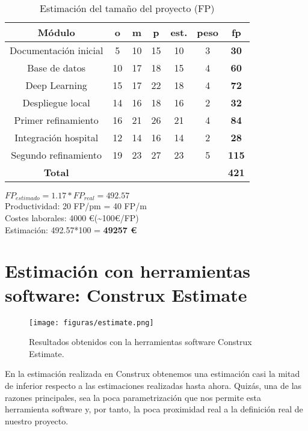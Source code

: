 \begin{table}[H]
	\begin{center}
		\begin{tabular}{|c||c|c|c|c|c|c|}
			\hline 
			Módulo & o & m & p & est. & peso & \textbf{fp} \\
			\hline \hline
			Documentación inicial & 5 & 10 & 15 & 10 & 3 & \textbf{30}  \\ \hline
			Base de datos & 10 & 17 & 18 & 15 & 4 & \textbf{60}  \\ \hline
			Deep Learning & 15 & 17 & 22 & 18 & 4 & \textbf{72}  \\ \hline
			Despliegue local & 14 & 16 & 18 & 16 & 2 & \textbf{32}  \\ \hline
			Primer refinamiento & 16 & 21 & 26 & 21 & 4 & \textbf{84}  \\ \hline
			Integración hospital & 12 & 14 & 16 & 14 & 2 & \textbf{28}  \\ \hline
			Segundo refinamiento & 19 & 23 & 27 & 23 & 5 & \textbf{115}  \\ \hline
			\textbf{Total} & & & & & & \textbf{421}  \\ \hline
		\end{tabular}
		\caption{Estimación del tamaño del proyecto (FP)}
		\label{tabla:FP}
	\end{center}
\end{table}


$FP_{estimado} = 1.17 * FP_{real} = 492.57$ \\
Productividad: 20 FP/pm = 40 FP/m \\
Costes laborales: 4000 \euro (\textasciitilde{}100\euro/FP) \\
Estimación: 492.57*100 = \textbf{49257 \euro} 

\section{Estimación con herramientas software: Construx Estimate}

\begin{figure}[H]
	\centering
	\texttt{[image: figuras/estimate.png]}
	\caption{Resultados obtenidos con la herramientas software Construx Estimate.} 
	\label{fig:estimate}
\end{figure}

En la estimación realizada en Construx obtenemos una estimación casi la mitad de inferior respecto a las estimaciones realizadas hasta ahora. Quizás, una de las razones principales, sea la poca parametrización que nos permite esta herramienta software y, por tanto, la poca proximidad real a la definición real de nuestro proyecto.

